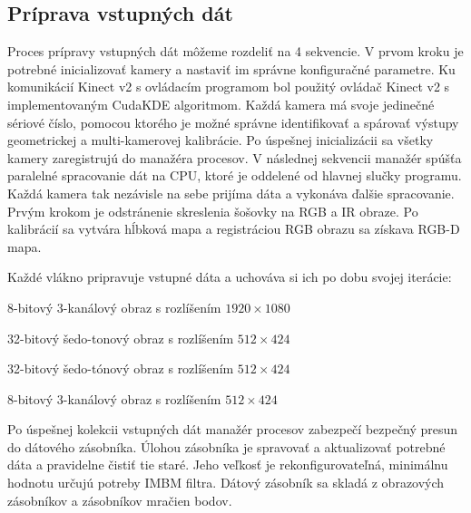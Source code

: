 

\subsection{Príprava vstupných dát}
\label{sec:data_prep}
Proces prípravy vstupných dát môžeme rozdeliť na 4 sekvencie.
V prvom kroku je potrebné inicializovať kamery a nastaviť im správne konfiguračné parametre. Ku komunikácií Kinect v2 s ovládacím programom bol použitý ovládač Kinect v2 s implementovaným CudaKDE algoritmom. Každá kamera má svoje jedinečné sériové číslo, pomocou ktorého je možné správne identifikovať a spárovať výstupy geometrickej a multi-kamerovej kalibrácie. Po úspešnej inicializácii sa všetky kamery zaregistrujú do manažéra procesov. V následnej sekvencii manažér spúšťa paralelné spracovanie dát na CPU, ktoré je oddelené od hlavnej slučky programu. Každá kamera tak nezávisle na sebe prijíma dáta a vykonáva ďalšie spracovanie. Prvým krokom je odstránenie skreslenia šošovky na RGB a IR obraze. Po kalibrácií sa vytvára hĺbková mapa a registráciou RGB obrazu sa získava RGB-D mapa. \newline

Každé vlákno pripravuje vstupné dáta a uchováva si ich po dobu svojej iterácie:

\begin{description}[leftmargin=*, font=$\bullet$~\normalfont\scshape\color{black}]
	\item[RGB:] 	8-bitový 3-kanálový obraz s rozlíšením $1920 \times 1080$
	\item[IR:]	32-bitový šedo-tonový obraz s rozlíšením $512 \times 424$
	\item[Depth:] 32-bitový šedo-tónový obraz s rozlíšením $512 \times 424$
	\item[RGB-D:] 8-bitový 3-kanálový obraz s rozlíšením $512 \times 424$
\end{description}

Po úspešnej kolekcii vstupných dát manažér procesov zabezpečí bezpečný presun do dátového zásobníka. Úlohou zásobníka je spravovať a aktualizovať potrebné dáta a pravidelne čistiť tie staré. Jeho veľkosť je rekonfigurovateľná, minimálnu hodnotu určujú potreby IMBM filtra. Dátový zásobník sa skladá z obrazových zásobníkov a zásobníkov mračien bodov. 

